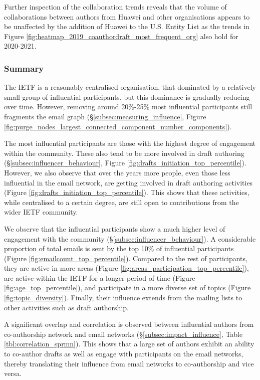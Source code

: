 \documentclass[twocolumn,10pt]{article}
\begin{document}
Further inspection of the collaboration trends reveals that the volume of
collaborations between authors from Huawei and other organisations appears
to be unaffected by the addition of Huawei to the U.S. Entity List
\cite{bis:2019:entity} as the trends in Figure 
\ref{fig:heatmap_2019_coauthordraft_most_frequent_org} also hold for 2020-2021.

\subsubsection{Summary}


The IETF is a reasonably centralised organisation, that dominated by a
relatively small group of influential participants, but this dominance
is gradually reducing over time.
However, removing around 20\%-25\% most influential participants still
fragments the email graph (\S\ref{subsec:measuring_influence}, Figure
\ref{fig:purge_nodes_largest_connected_component_number_components}).

The most influential participants are those with the highest degree of
engagement within the community. These also tend to be more involved in
draft authoring (\S\ref{subsec:influencer_behaviour}, Figure
\ref{fig:drafts_initiation_top_percentile}). However, we also observe that
over the years more people, even those less influential in the email
network, are getting involved in draft authoring activities (Figure
\ref{fig:drafts_initiation_top_percentile}). This shows that these
activities, while centralised to a certain degree, are still open to
contributions from the wider IETF community.

We observe that the influential participants show a much higher level of
engagement with the community (\S\ref{subsec:influencer_behaviour}). A
considerable proportion of total emails is sent by the top 10\% of
influential participants (Figure \ref{fig:emailcount_top_percentile}).
Compared to the rest of participants, they are active in more areas (Figure
\ref{fig:areas_participation_top_percentile}), are active within the IETF
for a longer period of time (Figure \ref{fig:age_top_percentile}), and
participate in a more diverse set of topics (Figure
\ref{fig:topic_diversity}). Finally, their influence extends from the
mailing lists to other activities such as draft authorship.

A significant overlap and correlation is observed between
influential authors from co-authorship network and email networks
(\S\ref{subsec:impact_influence}, Table \ref{tbl:correlation_sprmn}). This
shows that a large set of authors exhibit an ability to co-author drafts as
well as engage with participants on the email networks, thereby translating
their influence from email networks to co-authorship and vice versa. 
\end{document}
